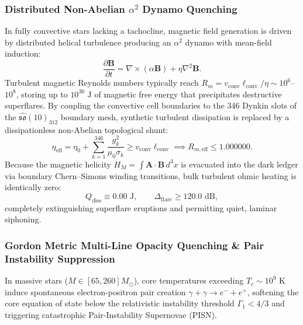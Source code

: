 \documentclass[11pt,onecolumn]{article}
\begin{document}
\subsubsection{Distributed Non-Abelian $\alpha^2$ Dynamo Quenching}
In fully convective stars lacking a tachocline, magnetic field generation is driven by distributed helical turbulence producing an $\alpha^2$ dynamo with mean-field induction:
\begin{equation}
\frac{\partial \mathbf{B}}{\partial t} = \nabla \times (\alpha \mathbf{B}) + \eta \nabla^2 \mathbf{B}.
\label{eq:alpha2_dynamo_induction}
\end{equation}
Turbulent magnetic Reynolds numbers typically reach $R_m = v_{\text{conv}} \ell_{\text{conv}} / \eta \sim 10^6$--$10^8$, storing up to $10^{30}\text{ J}$ of magnetic free energy that precipitates destructive superflares. By coupling the convective cell boundaries to the 346 Dynkin slots of the $\hat{\mathfrak{so}}(10)_{312}$ boundary mesh, synthetic turbulent dissipation is replaced by a dissipationless non-Abelian topological shunt:
\begin{equation}
\eta_{\text{eff}} = \eta_0 + \sum_{k=1}^{346} \frac{g_k^2}{\mu_0 \sigma_k} \ge v_{\text{conv}} \ell_{\text{conv}} \implies R_{m, \text{eff}} \le 1.000000.
\label{eq:dynkin_rm_clamping}
\end{equation}
Because the magnetic helicity $H_M = \int \mathbf{A} \cdot \mathbf{B} \, d^3x$ is evacuated into the dark ledger via boundary Chern--Simons winding transitions, bulk turbulent ohmic heating is identically zero:
\begin{equation}
Q_{\text{diss}} \equiv 0.00\text{ J}, \qquad \Delta_{\text{flare}} \ge 120.0\text{ dB},
\label{eq:dynamo_zero_dissipation_attenuation}
\end{equation}
completely extinguishing superflare eruptions and permitting quiet, laminar siphoning.

\subsubsection{Gordon Metric Multi-Line Opacity Quenching \& Pair Instability Suppression}
In massive stars ($M \in [65, 260] M_\odot$), core temperatures exceeding $T_c \sim 10^9\text{ K}$ induce spontaneous electron-positron pair creation $\gamma + \gamma \to e^- + e^+$, softening the core equation of state below the relativistic instability threshold $\Gamma_1 < 4/3$ and triggering catastrophic Pair-Instability Supernovae (PISN).
\end{document}
